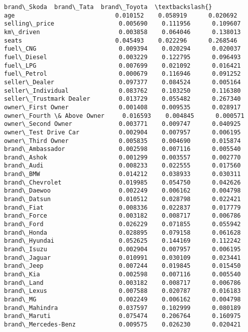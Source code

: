 \documentclass[11pt]{article}
\begin{document}
\begin{tcolorbox}[breakable, size=fbox, boxrule=.5pt, pad at break*=1mm, opacityfill=0]
\begin{Verbatim}[commandchars=\\\{\}]
                            brand\_Skoda  brand\_Tata  brand\_Toyota  \textbackslash{}
age                            0.010152    0.058919      0.020692
selling\_price                  0.005690    0.111956      0.109607
km\_driven                      0.003858    0.064046      0.138013
seats                          0.045493    0.022296      0.268546
fuel\_CNG                       0.009394    0.020294      0.020037
fuel\_Diesel                    0.003229    0.122795      0.096493
fuel\_LPG                       0.007699    0.021092      0.016421
fuel\_Petrol                    0.000679    0.116946      0.091252
seller\_Dealer                  0.097377    0.084524      0.005164
seller\_Individual              0.083762    0.103250      0.116380
seller\_Trustmark Dealer        0.013729    0.055482      0.267340
owner\_First Owner              0.001408    0.009535      0.028917
owner\_Fourth \& Above Owner     0.016593    0.004845      0.000571
owner\_Second Owner             0.003771    0.009747      0.040925
owner\_Test Drive Car           0.002904    0.007957      0.006195
owner\_Third Owner              0.005835    0.004690      0.015874
brand\_Ambassador               0.002598    0.007116      0.005540
brand\_Ashok                    0.001299    0.003557      0.002770
brand\_Audi                     0.008233    0.022555      0.017560
brand\_BMW                      0.014212    0.038933      0.030311
brand\_Chevrolet                0.019985    0.054750      0.042626
brand\_Daewoo                   0.002249    0.006162      0.004798
brand\_Datsun                   0.010512    0.028798      0.022421
brand\_Fiat                     0.008336    0.022837      0.017779
brand\_Force                    0.003182    0.008717      0.006786
brand\_Ford                     0.026229    0.071855      0.055942
brand\_Honda                    0.028895    0.079158      0.061628
brand\_Hyundai                  0.052625    0.144169      0.112242
brand\_Isuzu                    0.002904    0.007957      0.006195
brand\_Jaguar                   0.010991    0.030109      0.023441
brand\_Jeep                     0.007244    0.019845      0.015450
brand\_Kia                      0.002598    0.007116      0.005540
brand\_Land                     0.003182    0.008717      0.006786
brand\_Lexus                    0.007588    0.020787      0.016183
brand\_MG                       0.002249    0.006162      0.004798
brand\_Mahindra                 0.037597    0.102999      0.080189
brand\_Maruti                   0.075474    0.206764      0.160975
brand\_Mercedes-Benz            0.009575    0.026230      0.020421

\end{Verbatim}
\end{tcolorbox}
\end{document}

